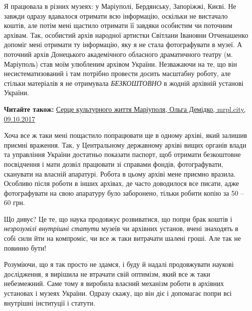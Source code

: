 Я працювала в різних музеях: у Маріуполі, Бердянську, Запоріжжі, Києві. Не
завжди одразу вдавалося отримати всю інформацію, оскільки не вистачало коштів,
але потім мені щастило отримати її завдяки особистим чи поточним архівам. Так,
особистий архів народної артистки Світлани Івановни Отченашенко допоміг мені
отримати ту інформацію, яку я не стала фотографувати в музеї. А поточний архів
Донецького академічного обласного драматичного театру (м. Маріуполь) став моїм
улюбленим архівом України. Незважаючи на те, що він несистематизований і там
потрібно провести досить масштабну роботу, але стільки матеріалів я не
отримувала \emph{БЕЗКОШТОВНО} в жодній архівній установі України.

\textbf{Читайте також:} \href{https://archive.org/details/09_10_2017.demidko_olga.mrpl_city.serce_kulturnogo_zhyttja_mariupolja}{%
Серце культурного життя Маріуполя, Ольга Демідко, mrpl.city, 09.10.2017}

Хоча все ж таки мені пощастило попрацювати ще в одному архіві, який залишив
приємні враження. Так, у Центральному державному архіві вищих органів влади та
управління України достатньо показати паспорт, щоб отримати безкоштовне
посвідчення і мати дозвіл працювати зі справами фондів, фотографувати,
сканувати на власній апаратурі. Робота в цьому архіві мене приємно вразила.
Особливо після роботи в інших архівах, де часто доводилося все писати, адже
фотографувати на свою апаратуру було заборонено, тільки робити копію за 50 – 60
грн.

Що дивує? Це те, що наука продовжує розвиватися, що попри брак коштів і
\emph{незрозумілі внутрішні статути} музеїв чи архівних установ, вчені знаходять в
собі сили йти на компроміс, чи все ж таки витрачати шалені гроші. Але так не
повинно бути!

Розуміючи, що я так просто не здамся, і буду й надалі продовжувати наукові
дослідження, я вирішила не втрачати свій оптимізм, який все ж таки небезмежний.
Саме тому я виробила власний механізм роботи в архівних установах і музеях
України. Одразу скажу, що він діє і допомагає попри всі внутрішні інституції і
статути. 

